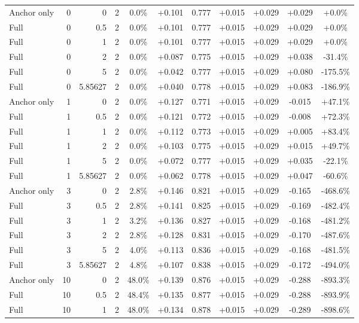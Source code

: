 \begin{table}[htbp]
\begin{tabular}{lrrrccccccc}
Anchor only & 0 & 0 & 2 & 0.0\% & +0.101 & 0.777 & +0.015 & +0.029 & +0.029 & +0.0\% \\
Full & 0 & 0.5 & 2 & 0.0\% & +0.101 & 0.777 & +0.015 & +0.029 & +0.029 & +0.0\% \\
Full & 0 & 1 & 2 & 0.0\% & +0.101 & 0.777 & +0.015 & +0.029 & +0.029 & +0.0\% \\
Full & 0 & 2 & 2 & 0.0\% & +0.087 & 0.775 & +0.015 & +0.029 & +0.038 & -31.4\% \\
Full & 0 & 5 & 2 & 0.0\% & +0.042 & 0.777 & +0.015 & +0.029 & +0.080 & -175.5\% \\
Full & 0 & 5.85627 & 2 & 0.0\% & +0.040 & 0.778 & +0.015 & +0.029 & +0.083 & -186.9\% \\
Anchor only & 1 & 0 & 2 & 0.0\% & +0.127 & 0.771 & +0.015 & +0.029 & -0.015 & +47.1\% \\
Full & 1 & 0.5 & 2 & 0.0\% & +0.121 & 0.772 & +0.015 & +0.029 & -0.008 & +72.3\% \\
Full & 1 & 1 & 2 & 0.0\% & +0.112 & 0.773 & +0.015 & +0.029 & +0.005 & +83.4\% \\
Full & 1 & 2 & 2 & 0.0\% & +0.103 & 0.775 & +0.015 & +0.029 & +0.015 & +49.7\% \\
Full & 1 & 5 & 2 & 0.0\% & +0.072 & 0.777 & +0.015 & +0.029 & +0.035 & -22.1\% \\
Full & 1 & 5.85627 & 2 & 0.0\% & +0.062 & 0.778 & +0.015 & +0.029 & +0.047 & -60.6\% \\
Anchor only & 3 & 0 & 2 & 2.8\% & +0.146 & 0.821 & +0.015 & +0.029 & -0.165 & -468.6\% \\
Full & 3 & 0.5 & 2 & 2.8\% & +0.141 & 0.825 & +0.015 & +0.029 & -0.169 & -482.4\% \\
Full & 3 & 1 & 2 & 3.2\% & +0.136 & 0.827 & +0.015 & +0.029 & -0.168 & -481.2\% \\
Full & 3 & 2 & 2 & 2.8\% & +0.128 & 0.831 & +0.015 & +0.029 & -0.170 & -487.6\% \\
Full & 3 & 5 & 2 & 4.0\% & +0.113 & 0.836 & +0.015 & +0.029 & -0.168 & -481.5\% \\
Full & 3 & 5.85627 & 2 & 4.8\% & +0.107 & 0.838 & +0.015 & +0.029 & -0.172 & -494.0\% \\
Anchor only & 10 & 0 & 2 & 48.0\% & +0.139 & 0.876 & +0.015 & +0.029 & -0.288 & -893.3\% \\
Full & 10 & 0.5 & 2 & 48.4\% & +0.135 & 0.877 & +0.015 & +0.029 & -0.288 & -893.9\% \\
Full & 10 & 1 & 2 & 48.0\% & +0.134 & 0.878 & +0.015 & +0.029 & -0.289 & -898.6\% \\

\end{tabular}
\end{table}
